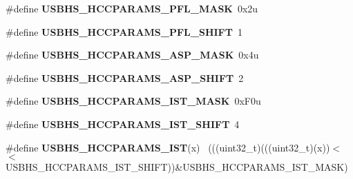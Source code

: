 \begin{DoxyCompactItemize}
\item 
\hypertarget{group___u_s_b_h_s___register___masks_gaa60806996078a28c6f2cd9fcfb8f9c07}{}\#define {\bfseries U\+S\+B\+H\+S\+\_\+\+H\+C\+C\+P\+A\+R\+A\+M\+S\+\_\+\+P\+F\+L\+\_\+\+M\+A\+S\+K}~0x2u\label{group___u_s_b_h_s___register___masks_gaa60806996078a28c6f2cd9fcfb8f9c07}

\item 
\hypertarget{group___u_s_b_h_s___register___masks_ga061b97654c35b4f8f39b8cdcd1739ffd}{}\#define {\bfseries U\+S\+B\+H\+S\+\_\+\+H\+C\+C\+P\+A\+R\+A\+M\+S\+\_\+\+P\+F\+L\+\_\+\+S\+H\+I\+F\+T}~1\label{group___u_s_b_h_s___register___masks_ga061b97654c35b4f8f39b8cdcd1739ffd}

\item 
\hypertarget{group___u_s_b_h_s___register___masks_ga5471ae7559e0d9247a4a8f46ea616d3a}{}\#define {\bfseries U\+S\+B\+H\+S\+\_\+\+H\+C\+C\+P\+A\+R\+A\+M\+S\+\_\+\+A\+S\+P\+\_\+\+M\+A\+S\+K}~0x4u\label{group___u_s_b_h_s___register___masks_ga5471ae7559e0d9247a4a8f46ea616d3a}

\item 
\hypertarget{group___u_s_b_h_s___register___masks_ga462b2d54e87cbeeb25f7ab7ec12c94a3}{}\#define {\bfseries U\+S\+B\+H\+S\+\_\+\+H\+C\+C\+P\+A\+R\+A\+M\+S\+\_\+\+A\+S\+P\+\_\+\+S\+H\+I\+F\+T}~2\label{group___u_s_b_h_s___register___masks_ga462b2d54e87cbeeb25f7ab7ec12c94a3}

\item 
\hypertarget{group___u_s_b_h_s___register___masks_ga18435f1619f13992945c538def8ab4d5}{}\#define {\bfseries U\+S\+B\+H\+S\+\_\+\+H\+C\+C\+P\+A\+R\+A\+M\+S\+\_\+\+I\+S\+T\+\_\+\+M\+A\+S\+K}~0x\+F0u\label{group___u_s_b_h_s___register___masks_ga18435f1619f13992945c538def8ab4d5}

\item 
\hypertarget{group___u_s_b_h_s___register___masks_gaf2a90450acb4486865d333f34e17b12c}{}\#define {\bfseries U\+S\+B\+H\+S\+\_\+\+H\+C\+C\+P\+A\+R\+A\+M\+S\+\_\+\+I\+S\+T\+\_\+\+S\+H\+I\+F\+T}~4\label{group___u_s_b_h_s___register___masks_gaf2a90450acb4486865d333f34e17b12c}

\item 
\hypertarget{group___u_s_b_h_s___register___masks_ga1a22bf9ebcbbe0ea687807a54cab1cf7}{}\#define {\bfseries U\+S\+B\+H\+S\+\_\+\+H\+C\+C\+P\+A\+R\+A\+M\+S\+\_\+\+I\+S\+T}(x)                                  ~(((uint32\+\_\+t)(((uint32\+\_\+t)(x))$<$$<$U\+S\+B\+H\+S\+\_\+\+H\+C\+C\+P\+A\+R\+A\+M\+S\+\_\+\+I\+S\+T\+\_\+\+S\+H\+I\+F\+T))\&U\+S\+B\+H\+S\+\_\+\+H\+C\+C\+P\+A\+R\+A\+M\+S\+\_\+\+I\+S\+T\+\_\+\+M\+A\+S\+K)\label{group___u_s_b_h_s___register___masks_ga1a22bf9ebcbbe0ea687807a54cab1cf7}


\end{DoxyCompactItemize}
